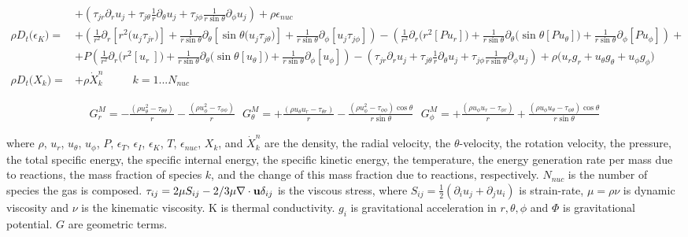 \documentclass[10pt,paper=a4]{report}
\begin{document}
\begin{align}
& + \left( \tau_{jr} \partial_r u_j + \tau_{j\theta} \frac{1}{r}\partial_\theta u_j + \tau_{j\phi} \frac{1}{r\sin{\theta}}\partial_\phi u_j  \right) + \rho \epsilon_{nuc} \\
\rho D_{t} \big(\epsilon_K\big) = & +\left( \frac{1}{r^2}\partial_r [r^2 \big(u_j\tau_{jr} \big)] + \frac{1}{r\sin{\theta}} \partial_\theta [\sin{\theta} \big(u_j\tau_{j\theta} \big)] + \frac{1}{r\sin{\theta}} \partial_\phi [u_j\tau_{j\phi}] \right) -\left( \frac{1}{r^2} \partial_r \big( r^2 [P u_r] \big) + \frac{1}{r \sin{\theta}} \partial_\theta \big(\sin{\theta}[P u_\theta] \big) + \frac{1}{r\sin{\theta}} \partial_\phi [ P u_\phi ] \right) + \nonumber \\
& + P \left( \frac{1}{r^{2}}\partial_{r}\big(r^{2}[u_{r}~]\big) + \frac{1}{r\sin{\theta}}\partial_{\theta} \big(\sin{\theta} [u_{\theta}]\big) + \frac{1}{r\sin{\theta}}\partial_{\phi} [u_{\phi}]  \right) - \left( \tau_{jr} \partial_r u_j + \tau_{j\theta} \frac{1}{r}\partial_\theta u_j + \tau_{j\phi} \frac{1}{r\sin{\theta}}\partial_\phi u_j  \right) +\rho \big(u_{r} g_r + u_{\theta} g_\theta + u_{\phi} g_\phi) \\
\rho D_{t} \big(X_{k}\big) = & + \rho \dot{X}_{k}^{n} \ \ \ \ \ \ \ \ \ \ \ \  k = 1 ... N_{nuc}
\end{align}

\begin{align}
G_r^M = -\frac{(\rho u_{\theta}^{2} - \tau_{\theta\theta})}{r} - \frac{(\rho u_{\phi}^{2} - \tau_{\phi\phi})}{r} \ \ \ G_\theta^M = + \frac{(\rho u_{\theta} u_{r} - \tau_{\theta r})}{r} -  \frac{(\rho u_{\phi}^{2} - \tau_{\phi\phi}) \cos{\theta}}{r \sin{\theta}} \ \ \ G_\phi^M = + \frac{(\rho u_{\phi} u_{r} - \tau_{\phi r})}{r} +  \frac{(\rho u_{\phi} u_{\theta} - \tau_{\phi \theta})\cos{\theta}}{r \sin{\theta}}
\end{align}

\fontsize{12pt}{20pt}

\noindent
where $\rho$, $u_r$, $u_{\theta}$, $u_{\phi}$, $P$, $\epsilon_T$, $\epsilon_I$, $\epsilon_K$, $T$, $\epsilon_{nuc}$, $X_k$, and $\dot{X}_k^n$ are the density, the radial velocity, the $\theta$-velocity, the rotation velocity, the pressure, the total specific energy, the specific internal energy, the specific kinetic energy, the temperature, the energy generation rate per mass due to reactions, the mass fraction of species $k$, and the change of this mass fraction due to reactions, respectively.  $N_{nuc}$ is the number of species the gas is composed. $\tau_{ij} = 2 \mu S_{ij} - 2/3 \mu \nabla \cdot {\bf u} \delta_{ij}$ is the viscous stress, where $S_{ij} = \frac{1}{2} (\partial_i u_j + \partial_j u_i)$ is strain-rate, $\mu = \rho \nu$ is dynamic viscosity and $\nu$ is the kinematic viscosity. K is thermal conductivity. $g_i$ is gravitational acceleration in $r, \theta, \phi$ and $\Phi$ is gravitational potential. $G$ are geometric terms. 
\end{document}
